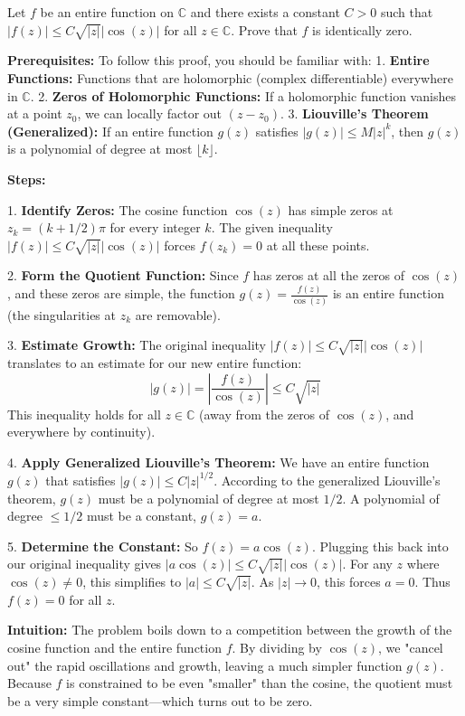 \begin{exercise}
\label{analysis:2023:5}
Let $f$ be an entire function on $\mathbb{C}$ and there exists a constant $C>0$ such that $|f(z)|\leq C\sqrt{|z|}|\cos(z)|$ for all $z\in\mathbb{C}$. Prove that $f$ is identically zero.
\end{exercise}

\begin{solution}
\textbf{Prerequisites:}
To follow this proof, you should be familiar with:
1. \textbf{Entire Functions:} Functions that are holomorphic (complex differentiable) everywhere in $\mathbb{C}$.
2. \textbf{Zeros of Holomorphic Functions:} If a holomorphic function vanishes at a point $z_0$, we can locally factor out $(z-z_0)$.
3. \textbf{Liouville's Theorem (Generalized):} If an entire function $g(z)$ satisfies $|g(z)| \leq M|z|^k$, then $g(z)$ is a polynomial of degree at most $\lfloor k \rfloor$.

\textbf{Steps:}

1. \textbf{Identify Zeros:}
The cosine function $\cos(z)$ has simple zeros at $z_k = (k + 1/2)\pi$ for every integer $k$. The given inequality $|f(z)| \leq C\sqrt{|z|}|\cos(z)|$ forces $f(z_k) = 0$ at all these points.

2. \textbf{Form the Quotient Function:}
Since $f$ has zeros at all the zeros of $\cos(z)$, and these zeros are simple, the function $g(z) = \frac{f(z)}{\cos(z)}$ is an entire function (the singularities at $z_k$ are removable).

3. \textbf{Estimate Growth:}
The original inequality $|f(z)| \leq C \sqrt{|z|} |\cos(z)|$ translates to an estimate for our new entire function:
\[ |g(z)| = \left| \frac{f(z)}{\cos(z)} \right| \leq C \sqrt{|z|} \]
This inequality holds for all $z \in \mathbb{C}$ (away from the zeros of $\cos(z)$, and everywhere by continuity).

4. \textbf{Apply Generalized Liouville's Theorem:}
We have an entire function $g(z)$ that satisfies $|g(z)| \leq C |z|^{1/2}$. According to the generalized Liouville's theorem, $g(z)$ must be a polynomial of degree at most $1/2$. A polynomial of degree $\leq 1/2$ must be a constant, $g(z) = a$.

5. \textbf{Determine the Constant:}
So $f(z) = a \cos(z)$. Plugging this back into our original inequality gives $|a \cos(z)| \leq C \sqrt{|z|} |\cos(z)|$. For any $z$ where $\cos(z) \neq 0$, this simplifies to $|a| \leq C \sqrt{|z|}$. As $|z| \to 0$, this forces $a = 0$. Thus $f(z) = 0$ for all $z$.

\textbf{Intuition:}
The problem boils down to a competition between the growth of the cosine function and the entire function $f$. By dividing by $\cos(z)$, we "cancel out" the rapid oscillations and growth, leaving a much simpler function $g(z)$. Because $f$ is constrained to be even "smaller" than the cosine, the quotient must be a very simple constant—which turns out to be zero.
\end{solution}

